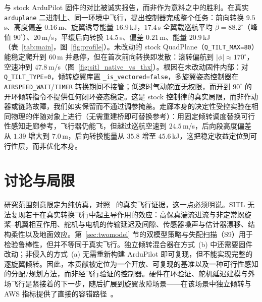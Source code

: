 \documentclass[UTF8,a4paper,11pt]{ctexart}
\begin{document}
与 stock ArduPilot 固件的对比被诚实报告，而非作为意料之中的胜利。在真实 \texttt{arduplane} 二进制上、同一环境中飞行，提出控制器完成整个任务：前向转换 $9.5$\,s、高度偏差 $0.16$\,m、旋翼诱导能量 $16.9$\,kJ，$17.4$\,s 全翼载巡航平均 $\bar\beta=88.2^\circ$（峰值 $90^\circ$）、$20$\,m/s，平缓后向转换 $14.5$\,s、偏差 $0.21$\,m、能量 $20.9$\,kJ（表~\ref{tab:main}，图~\ref{fig:profile}）。未改动的 stock QuadPlane（\texttt{Q\_TILT\_MAX=80}）能稳定爬升到 60\,m 并悬停，但在首次前向转换即发散：滚转偏航到 $|\phi|\approx170^\circ$，空速冲到 $47.8$\,m/s（图~\ref{fig:sitl_native_vs_thx}）。根因在未改动固件内部：对 \texttt{Q\_TILT\_TYPE=0}，倾转旋翼库置 \texttt{\_is\_vectored=false}，多旋翼姿态控制器在 \texttt{AIRSPEED\_WAIT}/\texttt{TIMER} 转换期间不接管；低速时气动舵面无权限，而开到 $90^\circ$ 的开环倾转指令不提供任何闭环姿态稳定。这是 stock 控制律的真实局限，而非作动器或链路故障，我们如实保留而不通过调参掩盖。走廊本身的决定性受控实验在相同物理的伴随对象上进行（无需重建桥即可替换参考）：用固定倾转调度替换可行性感知走廊参考，飞行器仍能飞，但越过巡航空速到 $24.5$\,m/s，后向段高度偏差从 $1.39$ 增大到 $7.0$\,m，后向转换能量从 $35.8$ 增至 $45.6$\,kJ，这把稳定收益定位到可行性层，而非优化本身。

\section{讨论与局限}\label{sec:discussion}
研究范围刻意限定为纯仿真，对照~\cite{bauersfeld2021mpc,allenspach2021nmpc,mancinelli2025unified} 的真实飞行证据，这一点必须明说。SITL 无法复现若干在真实转换飞行中起主导作用的效应：高保真湍流进流与非定常螺旋桨--机翼相互作用、舵机与电机的传输延迟及间隙、传感器噪声与估计器漂移、结构柔性以及地面效应。第~\ref{sec:twomodel} 节的双模型策略与失配扫描（S9）用于检验鲁棒性，但并不等同于真实飞行。独立倾转混合器在方式~(b) 中还需要固件改动；非侵入的方式~(a) 无需重新构建 ArduPilot 即可复现，但不能实现完整的逐旋翼倾转。因此，本贡献被定位为一个开放、可复现的基准以及一种可行性感知的分配/规划方法，而非经飞行验证的控制器。硬件在环验证、舵机延迟建模与外场飞行是紧接着的下一步，随后扩展到旋翼故障场景——在该场景中独立倾转与 AWS 指标提供了直接的容错路径~\cite{yang2026biaxial,santos2021fast,giribet2016tilted}。

\end{document}
